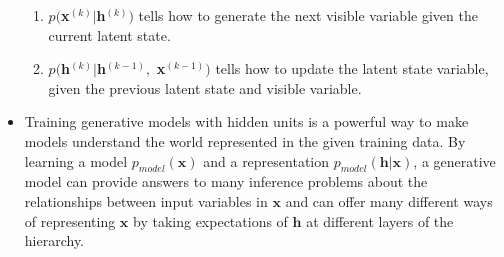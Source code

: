 \documentclass{article}
\begin{document}
\begin{itemize}
\begin{enumerate}
\item \(p(\)\textbf{x}\(^{(k)}|\)\textbf{h}\(^{(k)})\) tells how to generate the next visible variable given the current latent state.
\item \(p(\)\textbf{h}\(^{(k)}|\)\textbf{h}\(^{(k-1)},\) \textbf{x}\(^{(k-1)})\) tells how to update the latent state variable, given the previous latent state and visible variable.
\end{enumerate}
\item Training generative models with hidden units is a powerful way to make models understand the world represented in the given training data. By learning a model \(p_{model}(\boldsymbol{x})\) and a representation \(p_{model}(\boldsymbol{h}|\boldsymbol{x})\), a generative model can provide answers to many inference problems about the relationships between input variables in \(\boldsymbol{x}\) and can offer many different ways of representing \(\boldsymbol{x}\) by taking expectations of \(\boldsymbol{h}\) at different layers of the hierarchy.
\end{itemize}



\end{document}
